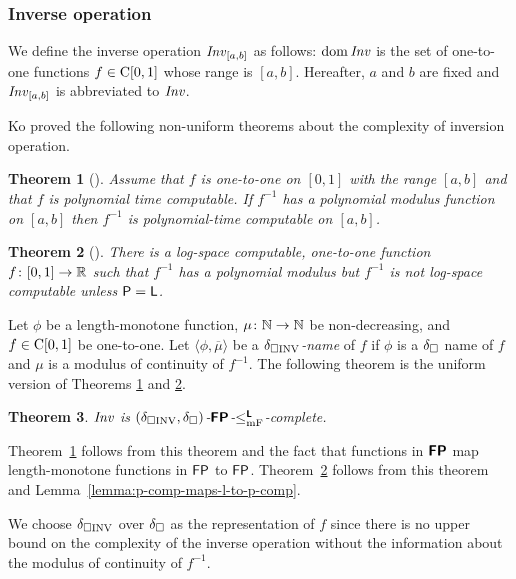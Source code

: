 \documentclass{article}
\newtheorem{theorem}{Theorem}[section]
\theoremstyle{definition}
\theoremstyle{remark}
\begin{document}
\subsubsection{Inverse operation}

We define the inverse operation $\mathit{Inv}_{[a,b]}$ as follows:
$\mathop{\rm dom} \mathit{Inv}$ is the set of one-to-one functions $f \in \mathrm C[0,1]$
whose range is $[a,b]$.
Hereafter, $a$ and $b$ are fixed and $\mathit{Inv}_{[a,b]}$ is abbreviated to $\mathit{Inv}$.

Ko proved the following non-uniform theorems about the complexity of 
inversion operation.
\begin{theorem}
[{\cite[Corollary 4.7]{ko1991complexity}}]
\label{theorem:ko1991-4.7}
Assume that $f$ is one-to-one on $[0,1]$ with the range $[a, b]$ and that 
$f$ is polynomial time computable. 
If $f^{-1}$ has a polynomial modulus function on $[a,b]$ then
$f^{-1}$ is polynomial-time computable on $[a, b]$.
\end{theorem}
\begin{theorem}
[{\cite[Theorem 4.18]{ko1991complexity}}]
\label{theorem:ko1991-4.18}
There is a log-space computable, one-to-one function $f \colon [0, 1] \to \mathbb R$
such that $f^{-1}$ has a polynomial modulus 
but $f^{-1}$ is not log-space computable
unless $\mathsf{P} = \mathsf{L}$.
\end{theorem}

Let $\phi$ be a length-monotone function, 
$\mu \colon \mathbb N \to \mathbb N$ be non-decreasing, 
and $f \in \mathrm C[0,1]$ be one-to-one. 
Let $\langle \phi, \overline{\mu} \rangle$ be a \emph{$\delta _{\square \mathrm{INV}}$-name} of $f$
if $\phi$ is a $\delta _\square$ name of $f$ 
and $\mu$ is a modulus of continuity of $f^{-1}$.
The following theorem is the uniform version of Theorems 
\ref{theorem:ko1991-4.7} and 
\ref{theorem:ko1991-4.18}.

\begin{theorem}
 \label{theorem:INV-is-P-complete}
 $\mathit{Inv}$ is $(\delta _{\square \mathrm{INV}}, \delta _\square)$-$\text{\bfseries \sffamily \upshape FP}$-$\leq _{\mathrm{mF}} ^{\text{\bfseries \sffamily \upshape L}}$-complete.
\end{theorem}


Theorem~\ref{theorem:ko1991-4.7} follows from this theorem and the fact that
functions in $\text{\bfseries \sffamily \upshape FP}$ map length-monotone functions in $\mathsf{FP}$ to $\mathsf{FP}$.
Theorem~\ref{theorem:ko1991-4.18} follows from this theorem and Lemma~\ref{lemma:p-comp-maps-l-to-p-comp}.


We choose $\delta _{\square \mathrm{INV}}$  over $\delta _\square$ as the representation of $f$
since there is no upper bound on the complexity of the inverse operation 
without the information about the modulus of continuity of $f^{-1}$.
\end{document}
